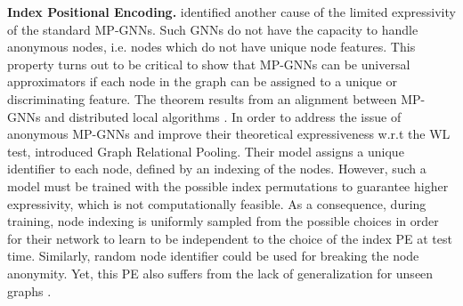 \documentclass{article} \usepackage{iclr2021_conference,times}
\begin{document}
{\bf Index Positional Encoding.} \cite{Loukas2020What} identified another cause of the limited expressivity of the standard MP-GNNs. Such GNNs do not have the capacity to handle anonymous nodes, i.e. nodes which do not have unique node features. This property turns out to be critical to show that MP-GNNs can be universal approximators if each node in the graph can be assigned to a unique or discriminating feature. The theorem results from an alignment between MP-GNNs and distributed local algorithms \citep{naor1995can, sato2019approximation}. In order to address the issue of anonymous MP-GNNs and improve their theoretical expressiveness w.r.t the WL test, \cite{murphy2019relational} introduced Graph Relational Pooling. Their model assigns a unique identifier to each node, defined by an indexing of the nodes. However, such a model must be trained with the  possible index permutations to guarantee higher expressivity, which is not computationally feasible. As a consequence, during training, node indexing is uniformly sampled from the  possible choices in order for their network to learn to be independent to the choice of the index PE at test time. Similarly, random node identifier could be used for breaking the node anonymity. Yet, this PE also suffers from the lack of generalization for unseen graphs \citep{Loukas2020What}. 
\end{document}
